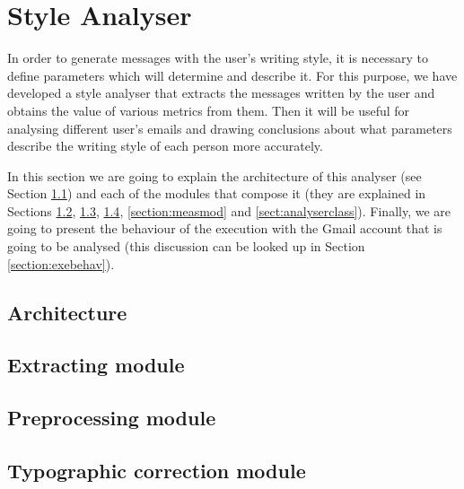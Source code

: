 \chapter{Style Analyser}
\label{cap:analyser}


In order to generate messages with the user's writing style, it is necessary to define parameters which will determine and describe it. For this purpose, we have developed a style analyser that extracts the messages written by the user and obtains the value of various metrics from them. Then it will be useful for analysing different user's emails and drawing conclusions about what parameters describe the writing style of each person more accurately.

In this section we are going to explain the architecture of this analyser (see Section \ref{section:stylearch}) and each of the modules that compose it (they are explained in Sections \ref{section:extmod}, \ref{section:prepmod}, \ref{section:typomod}, \ref{section:measmod} and \ref{sect:analyserclass}). Finally, we are going to present the behaviour of the execution with the Gmail account that is going to be analysed (this discussion can be looked up in Section \ref{section:exebehav}).

\section{Architecture} \label{section:stylearch}


\section{Extracting module} \label{section:extmod}


\section{Preprocessing module} \label{section:prepmod}


\section{Typographic correction module} \label{section:typomod}


